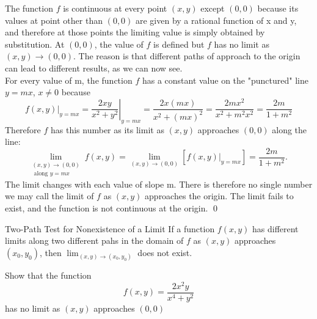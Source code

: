 \documentclass[12pt,a4paper]{article}
\newenvironment{ruleBox}[1]{\begin{rulebox}{#1}}{\end{rulebox}\vspace{1\baselineskip}}
\begin{document}
\begin{solution}
    The function \(f\) is continuous at every point \((x,y)\) except \((0,0)\) because its values at point other than  \((0,0)\) are given by a rational function of x and y, and therefore at those points the limiting value is simply obtained by substitution.
    At \((0,0)\), the value of \(f\) is defined but  \(f\) has no limit as \((x,y) \to (0,0)\). The reason is that different paths of approach to the origin can lead to different results, as we can now see.\\
    For every value of m, the function \(f\) has a constant value on the "punctured" line \(y=mx\), \(x\neq0\) because
    \[\left.f(x, y)\right|_{y=m x}=\left.\frac{2 x y}{x^2+y^2}\right|_{y=m x}=\frac{2 x(m x)}{x^2+(m x)^2}=\frac{2 m x^2}{x^2+m^2 x^2}=\frac{2 m}{1+m^2}\]
    Therefore \(f\) has this number as its limit as \((x,y)\) approaches \((0,0)\) along the line:
    \[\lim _{\substack{(x, y) \rightarrow(0,0) \\ \text { along } y=m x}} f(x, y)=\lim _{(x, y) \rightarrow(0,0)}\left[\left.f(x, y)\right|_{y=m x}\right]=\frac{2 m}{1+m^2} \text {. }\]
    The limit changes with each value of slope m. There is therefore no single number we may call the limit of \(f\) as \((x,y)\) approaches the origin. The limit fails to exist, and the function is not continuous at the origin. \hfill \qed

\end{solution}

\newpage

\begin{ruleBox}{Two-Path Test for Nonexistence of a Limit}
    If a function \(f(x,y)\) has different limits along two different pahs in the domain of \(f\) as \((x,y)\) approaches \((x_0,y_0)\), then \(\lim_{(x,y) \to (x_0,y_0)}\) does not exist.

\end{ruleBox}

\begin{example}
    Show that the function 
    \[f(x,y) = \frac{2x^2y}{x^4+y^2}\]
    has no limit as \((x,y)\) approaches \((0,0)\)

\end{example}
\end{document}
